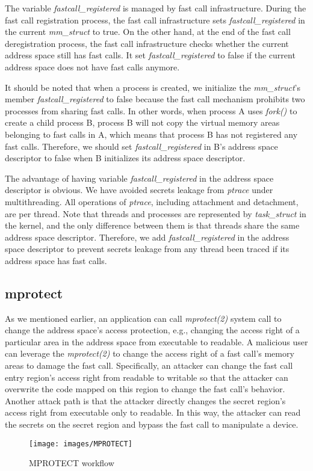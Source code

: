 The variable \emph{fastcall\_registered} is managed by fast call 
infrastructure. During the fast call registration process,  
the fast call infrastructure sets \emph{fastcall\_registered} in the current 
\emph{mm\_struct} to true. On the other hand, at the end of the fast call 
deregistration process, the fast call infrastructure checks whether 
the current address space still has fast calls. It set \emph{fastcall\_registered}  
to false if the current address space does not have fast calls anymore.


It should be noted that when a process is created, we initialize 
the \emph{mm\_struct}'s member \emph{fastcall\_registered}  to false because 
the fast call mechanism prohibits two processes from sharing fast calls.
 In other words, when process A uses \emph{fork()} to create a child process B, 
 process B will not copy the virtual memory areas belonging to fast calls in A, 
 which means that process B has not registered any fast calls. 
 Therefore, we should set \emph{fastcall\_registered}  in B's address space 
 descriptor to false when B initializes its address space descriptor.

 The advantage of having variable \emph{fastcall\_registered} in the address space 
 descriptor is obvious.  We have avoided secrets leakage from \emph{ptrace} under 
 multithreading. All operations of \emph{ptrace}, including attachment and detachment, 
 are per thread. Note that threads and processes are represented by \emph{task\_struct}
 in the kernel, and the only difference between them is that threads share 
the same address space descriptor. Therefore, we add \emph{fastcall\_registered} 
in the address space descriptor to prevent secrets leakage from any thread 
been traced if its address space has fast calls.


\subsection{mprotect}
As we mentioned earlier, an application can call \emph{mprotect(2)}  
system call to change the address space's access protection, 
e.g., changing the access right of a particular area in the address 
space from executable to readable.  A malicious user can leverage the 
\emph{mprotect(2)} to change the access right of a fast call's memory areas to 
damage the fast call. Specifically, an attacker can change the fast 
call entry region's access right from readable to writable so that the attacker can overwrite 
the code mapped on this region to change the fast call's behavior. 
Another attack path is that the attacker directly changes the secret 
region's access right from executable only to readable. In this way, 
the attacker can read the secrets on the secret region and bypass the 
fast call to manipulate a device.
\begin{figure}[H]
  \centering
  \texttt{[image: images/MPROTECT]}
  \caption[Short description]{MPROTECT workflow}
  \label{fig:MPROTECT}
\end{figure}

